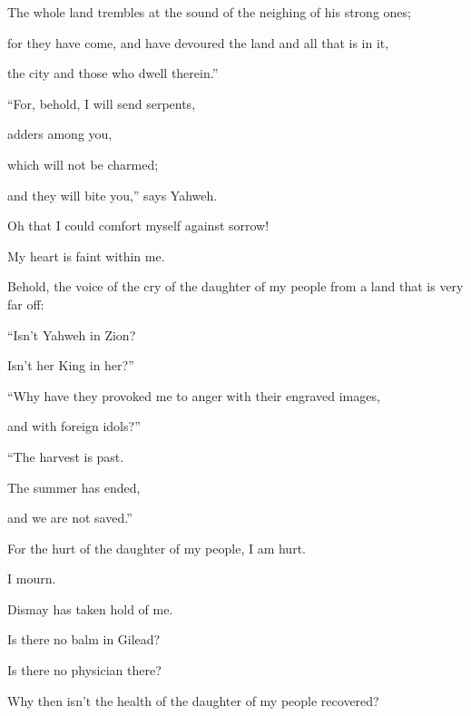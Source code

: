 {\par }{\QB The whole land trembles at the sound of the neighing of his strong ones;
\par }{\Q for they have come, and have devoured the land and all that is in it,
\par }{\QB the city and those who dwell therein.”
\par }{\Q {}“For, behold, I will send serpents,
\par }{\QB adders among you,
\par }{\QB which will not be charmed;
\par }{\QB and they will bite you,” says Yahweh.
\par }{\Q {}Oh that I could comfort myself against sorrow!
\par }{\QB My heart is faint within me.
\par }{\Q {}Behold, the voice of the cry of the daughter of my people from a land that is very far off:
\par }{\QB “Isn’t Yahweh in Zion?
\par }{\QB Isn’t her King in her?”
\par }{\BB \par }{\Q “Why have they provoked me to anger with their engraved images,
\par }{\QB and with foreign idols?”
\par }{\BB \par }{\Q {}“The harvest is past.
\par }{\QB The summer has ended,
\par }{\QB and we are not saved.”
\par }{\BB \par }{\Q {}For the hurt of the daughter of my people, I am hurt.
\par }{\QB I mourn.
\par }{\QB Dismay has taken hold of me.
\par }{\Q {}Is there no balm in Gilead?
\par }{\QB Is there no physician there?
\par }{\Q Why then isn’t the health of the daughter of my people recovered?

}
